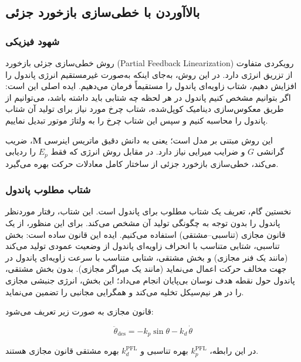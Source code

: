 \subsection{بالاآوردن با خطی‌سازی بازخورد جزئی}

\subsubsection{شهود فیزیکی}

روش خطی‌سازی جزئی بازخورد (Partial Feedback Linearization) رویکردی متفاوت از تزریق انرژی دارد. در این روش، به‌جای اینکه به‌صورت غیرمستقیم انرژی پاندول را افزایش دهیم، شتاب زاویه‌ای پاندول را مستقیماً فرمان می‌دهیم. ایده اصلی این است: اگر بتوانیم مشخص کنیم پاندول در هر لحظه چه شتابی باید داشته باشد، می‌توانیم از طریق معکوس‌سازی دینامیک کوپل‌شده، شتاب چرخ مورد نیاز برای تولید آن شتاب پاندول را محاسبه کنیم و سپس این شتاب چرخ را به ولتاژ موتور تبدیل نماییم.

این روش مبتنی بر مدل است؛ یعنی به دانش دقیق ماتریس اینرسی $\mathbf{M}$، ضریب گرانشی $G$ و ضرایب میرایی نیاز دارد. در مقابل روش انرژی که فقط $E_p$ را ردیابی می‌کند، خطی‌سازی بازخورد جزئی از ساختار کامل معادلات حرکت بهره می‌گیرد.

\subsubsection{شتاب مطلوب پاندول}

نخستین گام، تعریف یک شتاب مطلوب برای پاندول است. این شتاب، رفتار موردنظر پاندول را بدون توجه به چگونگی تولید آن مشخص می‌کند. برای این منظور، از یک قانون مجازی  (تناسبی--مشتقی) استفاده می‌کنیم. ایده این قانون ساده است: بخش تناسبی، شتابی متناسب با انحراف زاویه‌ای پاندول از وضعیت عمودی تولید می‌کند (مانند یک فنر مجازی) و بخش مشتقی، شتابی متناسب با سرعت زاویه‌ای پاندول در جهت مخالف حرکت اعمال می‌نماید (مانند یک میراگر مجازی). بدون بخش مشتقی، پاندول حول نقطه هدف نوسان بی‌پایان انجام می‌داد؛ این بخش، انرژی جنبشی مجازی را در هر نیم‌سیکل تخلیه می‌کند و همگرایی مجانبی را تضمین می‌نماید.

قانون مجازی  به صورت زیر تعریف می‌شود:

\begin{equation}
    \ddot\theta_{\text{des}} = -k_p \sin\theta - k_d\, \dot\theta
\end{equation}

در این رابطه، $k_p^{\text{PFL}}$ بهره تناسبی و $k_d^{\text{PFL}}$ بهره مشتقی قانون مجازی  هستند.

